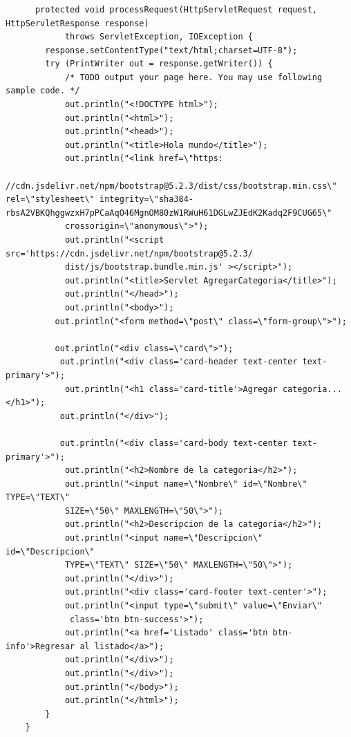 \documentclass[10pt,a4paper]{article}
\begin{document}
\subsubsection{\color{colorGENERICO}{Agregar}}
\begin{lstlisting}
	  protected void processRequest(HttpServletRequest request, HttpServletResponse response)
            throws ServletException, IOException {
        response.setContentType("text/html;charset=UTF-8");
        try (PrintWriter out = response.getWriter()) {
            /* TODO output your page here. You may use following sample code. */
            out.println("<!DOCTYPE html>");
            out.println("<html>");
            out.println("<head>");
            out.println("<title>Hola mundo</title>");            
            out.println("<link href=\"https:
            //cdn.jsdelivr.net/npm/bootstrap@5.2.3/dist/css/bootstrap.min.css\" rel=\"stylesheet\" integrity=\"sha384-rbsA2VBKQhggwzxH7pPCaAqO46MgnOM80zW1RWuH61DGLwZJEdK2Kadq2F9CUG65\" 
            crossorigin=\"anonymous\">");
            out.println("<script src='https://cdn.jsdelivr.net/npm/bootstrap@5.2.3/
            dist/js/bootstrap.bundle.min.js' ></script>");
            out.println("<title>Servlet AgregarCategoria</title>");            
            out.println("</head>");
            out.println("<body>");
          out.println("<form method=\"post\" class=\"form-group\">");
          
          out.println("<div class=\"card\">");
           out.println("<div class='card-header text-center text-primary'>");
            out.println("<h1 class='card-title'>Agregar categoria...</h1>");
           out.println("</div>");
           
           out.println("<div class='card-body text-center text-primary'>");
            out.println("<h2>Nombre de la categoria</h2>");
            out.println("<input name=\"Nombre\" id=\"Nombre\" TYPE=\"TEXT\" 
            SIZE=\"50\" MAXLENGTH=\"50\">");
            out.println("<h2>Descripcion de la categoria</h2>");
            out.println("<input name=\"Descripcion\" id=\"Descripcion\" 
            TYPE=\"TEXT\" SIZE=\"50\" MAXLENGTH=\"50\">");
            out.println("</div>");          
            out.println("<div class='card-footer text-center'>");
            out.println("<input type=\"submit\" value=\"Enviar\"
             class='btn btn-success'>");
            out.println("<a href='Listado' class='btn btn-info'>Regresar al listado</a>");
            out.println("</div>");
            out.println("</div>");
            out.println("</body>");
            out.println("</html>");
        }
    }
    

\end{lstlisting}
\end{document}
